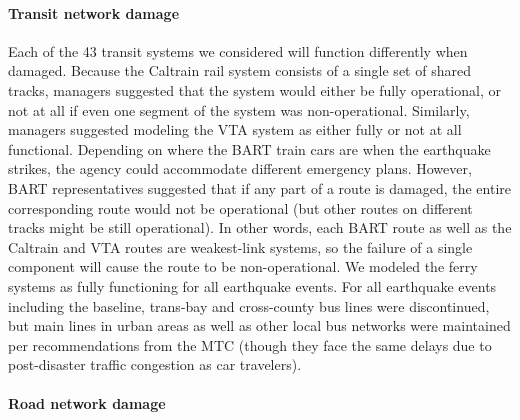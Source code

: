 \paragraph{Transit network damage}
\label{sec:transitDamage}
Each of the 43 transit systems we considered will function differently when damaged. Because the Caltrain rail system consists of a single set of shared tracks, managers suggested that the system would either be fully operational, or not at all if even one segment of the system was non-operational. Similarly, managers suggested modeling the VTA system as either fully or not at all functional. Depending on where the BART train cars are when the earthquake strikes, the agency could accommodate different emergency plans. However, BART representatives suggested that if any part of a route is damaged, the entire corresponding route would not be operational (but other routes on different tracks might be still operational).  In other words, each BART route as well as the Caltrain and VTA routes are weakest-link systems, so the failure of a single component  will cause the route to be non-operational. We modeled the ferry systems as fully functioning for all earthquake events. For all earthquake events including the baseline, trans-bay and cross-county bus lines were discontinued, but main lines in urban areas as well as other local bus networks were maintained per recommendations from the MTC (though they face the same delays due to post-disaster traffic congestion as car travelers). 

\paragraph{Road network damage}


